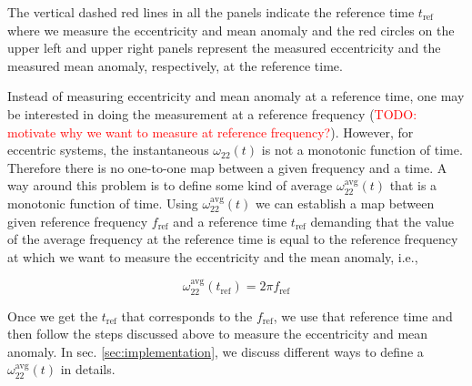 \documentclass[aps,prd,amsmath,floats,floatfix, twocolumn,
superscriptaddress,nofootinbib,showpacs]{revtex4-1}
\newcommand{\red}{\textcolor{red}}
\newcommand{\TODO}[1]{\red{TODO: #1}}
\newcommand{\avgOmega}{\omega^{\text{avg}}_{22}}
\newcommand{\tref}{t_{\text{ref}}}
\newcommand{\fref}{f_{\text{ref}}}
\begin{document}
The vertical dashed red lines in all the panels indicate the reference
time $\tref$ where we measure the eccentricity and mean
anomaly and the red circles on the upper left and upper right panels
represent the measured eccentricity and the measured mean anomaly,
respectively, at the reference time.

Instead of measuring eccentricity and mean anomaly at a reference
time, one may be interested in doing the measurement at a reference
frequency (\TODO{motivate why we want to measure at reference
frequency?}). However, for eccentric systems, the instantaneous
$\omega_{22}(t)$ is not a monotonic function of time. Therefore there
is no one-to-one map between a given frequency and a time. A way
around this problem is to define some kind of average
$\avgOmega(t)$ that is a monotonic function of
time. Using $\avgOmega(t)$ we can establish a map
between given reference frequency $\fref$ and a reference
time $\tref$ demanding that the value of the average
frequency at the reference time is equal to the reference frequency at
which we want to measure the eccentricity and the mean anomaly, i.e.,

\begin{equation}
  \label{eq:map-between-ref-freq-and-ref-time}
  \avgOmega(\tref) = 2 \pi \fref
\end{equation}

Once we get the $\tref$ that corresponds to the
$\fref$, we use that reference time and then follow the steps
discussed above to measure the eccentricity and mean anomaly. In
sec. \ref{sec:implementation}, we discuss different ways to define a
$\avgOmega(t)$ in details.
\end{document}
